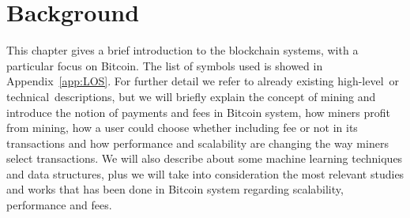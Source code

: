 \documentclass[USenglish]{uit-thesis}
\begin{document}
\chapter{Background}
\label{chap:techback}
This chapter gives a brief introduction to
the blockchain systems, with a particular
focus on Bitcoin. The list of symbols
used is showed in Appendix~\ref{app:LOS}.
For further detail we refer
to already existing high-level\,\cite{Bohme2015BETG} or
technical\,\cite{ethereum, bitcoinmining,
bitcoin_blockchain, Rizun:2015:blocksizelimit, Nakamoto_bitcoin,
ethereum_white_paper} descriptions, but we will briefly explain
the concept of mining and introduce the notion
of payments and fees in Bitcoin system,
how miners profit from mining,
how a user could choose whether including fee or not in its
transactions and how performance and scalability are
changing the way miners select transactions.
We will also describe about some machine learning
techniques and data structures, plus we will take into
consideration the most relevant studies and works
that has been done in Bitcoin system regarding
scalability, performance and fees.
\end{document}
